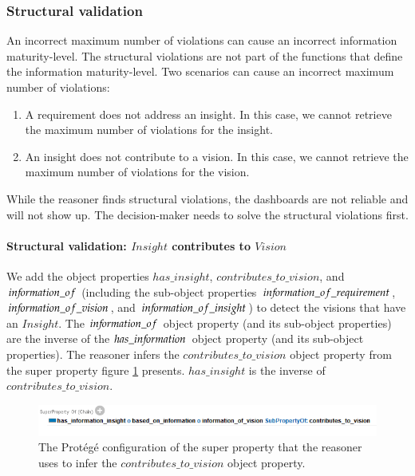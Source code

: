 \subsubsection{Structural validation}
An incorrect maximum number of violations can cause an incorrect information maturity-level. The structural violations are not part of the functions that define the information maturity-level. Two scenarios can cause an incorrect maximum number of violations:
\begin{enumerate}
\item A requirement does not address an insight. In this case, we cannot retrieve the maximum number of violations for the insight.
\item An insight does not contribute to a vision. In this case, we cannot retrieve the maximum number of violations for the vision.
\end{enumerate}

While the reasoner finds structural violations, the dashboards are not reliable and will not show up. The decision-maker needs to solve the structural violations first.

\paragraph{Structural validation: $Insight$ contributes to $Vision$}
We add the object properties $has\_insight$, $contributes\_to\_vision$, and $in{\mkern-2mu f\mkern-3mu}ormation\_of$ (including the sub-object properties $in{\mkern-2mu f\mkern-3mu}ormation\_of\_requirement$, $in{\mkern-2mu f\mkern-3mu}ormation\_of\_vision$, and $in{\mkern-2mu f\mkern-3mu}ormation\_of\_insight$) to detect the visions that have an $Insight$. The $in{\mkern-2mu f\mkern-3mu}ormation\_of$ object property (and its sub-object properties) are the inverse of the $has\_in{\mkern-2mu f\mkern-3mu}ormation$ object property (and its sub-object properties). The reasoner infers the $contributes\_to\_vision$ object property from the super property figure \ref{fig:05_RP_contributes_to_vision_SP} presents. $has\_insight$ is the inverse of $contributes\_to\_vision$. 

\begin{figure}[H]
\centering
  \includegraphics[width=17cm]{../../Images/05_Validation/05_RP_Contributes_To_Vision_SP.png}
  \caption{The Prot\'eg\'e configuration of the super property that the reasoner uses to infer the $contributes\_to\_vision$ object property.}
  \label{fig:05_RP_contributes_to_vision_SP}
\end{figure}


